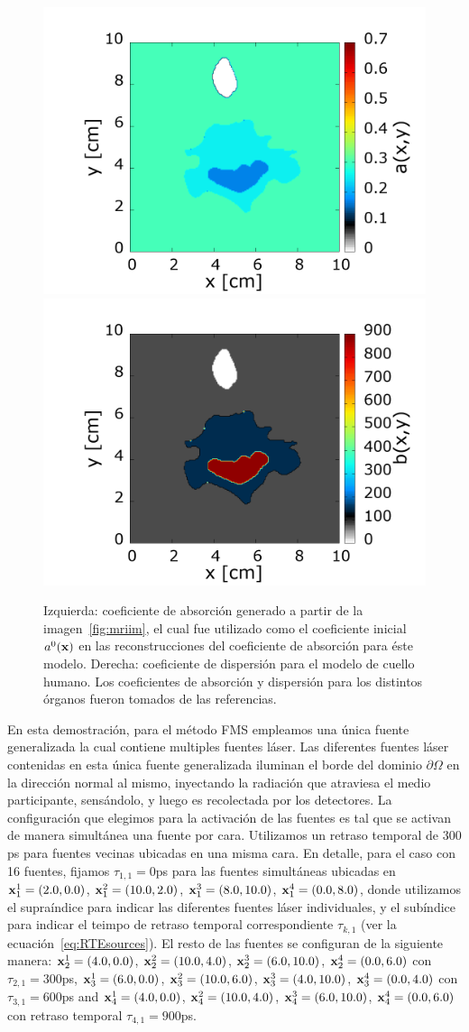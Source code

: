 \begin{figure}[h!]
\centering
  \includegraphics[width=0.48\linewidth]{figuras/neck_i.png} 
  \includegraphics[width=0.48\linewidth]{figuras/neckmss_scatt.png} 
  \caption{Izquierda: coeficiente de absorción 
  generado a partir de la imagen~\ref{fig:mriim}, el cual fue utilizado como el coeficiente 
  inicial $a^0(\mathbf{x})$ en las reconstrucciones del coeficiente de absorción para éste modelo. 
  Derecha: coeficiente de dispersión para el modelo de cuello humano.
  Los coeficientes de absorción y dispersión 
  para los distintos órganos fueron tomados de las referencias\cite{Bashkatov2011,Dehaes2011,Fujii2016}. } 
 \label{fig:mriimc}
\end{figure}

En esta demostración, para el método FMS empleamos una única fuente generalizada 
la cual contiene multiples fuentes láser. Las diferentes fuentes láser 
contenidas en esta única fuente generalizada iluminan el borde del dominio $\partial \Omega$ 
en la dirección normal al mismo, inyectando la radiación que atraviesa 
el medio participante, sensándolo, y luego es recolectada por los detectores. 
La configuración que elegimos para la activación de las fuentes es tal 
que se activan de manera simultánea una fuente por cara. 
Utilizamos un retraso temporal de $300$ps para fuentes vecinas ubicadas 
en una misma cara. En detalle, para el caso con 16 fuentes, fijamos 
$\tau_{1,1}=0$ps para las fuentes simultáneas ubicadas en $\mathbf{x}_1^1=(2.0,0.0)$, 
$\mathbf{x}_1^2=(10.0,2.0)$, $\mathbf{x}_1^3=(8.0,10.0)$,  $\mathbf{x}_1^4=(0.0,8.0)$, donde utilizamos 
el supraíndice para indicar las diferentes fuentes láser individuales, y el subíndice 
para indicar el teimpo de retraso temporal correspondiente $\tau_{k,1}$ (ver la ecuación~\eqref{eq:RTEsources}).
El resto de las fuentes se configuran de la siguiente manera: 
$\mathbf{x}_2^1=(4.0,0.0)$, 
$\mathbf{x}_2^2=(10.0,4.0)$, $\mathbf{x}_2^3=(6.0,10.0)$,  $\mathbf{x}_2^4=(0.0,6.0)$ con $\tau_{2,1}=300$ps, 
$\mathbf{x}_3^1=(6.0,0.0)$, 
$\mathbf{x}_3^2=(10.0,6.0)$, $\mathbf{x}_3^3=(4.0,10.0)$,  $\mathbf{x}_3^4=(0.0,4.0)$ con $\tau_{3,1}=600$ps 
and $\mathbf{x}_4^1=(4.0,0.0)$, 
$\mathbf{x}_4^2=(10.0,4.0)$, $\mathbf{x}_4^3=(6.0,10.0)$,  $\mathbf{x}_4^4=(0.0,6.0)$ con retraso temporal $\tau_{4,1}=900$ps. 

